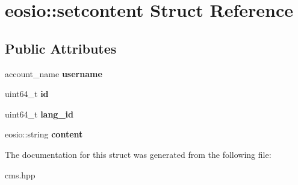 \hypertarget{structeosio_1_1setcontent}{}\section{eosio\+:\+:setcontent Struct Reference}
\label{structeosio_1_1setcontent}
\subsection*{Public Attributes}
\begin{DoxyCompactItemize}
\item 
\mbox{\label{structeosio_1_1setcontent_a83ab0a2907e6c762e6c738bf81830f75}} 
account\+\_\+name {\bfseries username}
\item 
\mbox{\label{structeosio_1_1setcontent_aff382e00a4d05342910bb4e14fff0189}} 
uint64\+\_\+t {\bfseries id}
\item 
\mbox{\label{structeosio_1_1setcontent_ac44afc4a80d45061d0052d16cf535683}} 
uint64\+\_\+t {\bfseries lang\+\_\+id}
\item 
\mbox{\label{structeosio_1_1setcontent_a99ef5843171166ee0e241492fd265d2c}} 
eosio\+::string {\bfseries content}
\end{DoxyCompactItemize}


The documentation for this struct was generated from the following file\+:\begin{DoxyCompactItemize}
\item 
cms.\+hpp\end{DoxyCompactItemize}
